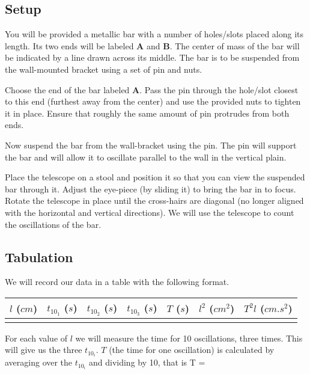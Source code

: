 \documentclass{article}
\begin{document}
      \subsection*{Setup}

         You will be provided a metallic bar with a number of holes/slots placed along its length. Its two ends will be labeled \textbf{A} and \textbf{B}. The center of mass of the bar will be indicated by a line drawn across its middle. The bar is to be suspended from the wall-mounted bracket using a set of pin and nuts.

         Choose the end of the bar labeled \textbf{A}. Pass the pin through the hole/slot closest to this end (furthest away from the center) and use the provided nuts to tighten it in place. Ensure that roughly the same amount of pin protrudes from both ends.

         Now suspend the bar from the wall-bracket using the pin. The pin will support the bar and will allow it to oscillate parallel to the wall in the vertical plain.

         Place the telescope on a stool and position it so that you can view the suspended bar through it. Adjust the eye-piece (by sliding it) to bring the bar in to focus. Rotate the telescope in place until the cross-hairs are diagonal (no longer aligned with the horizontal and vertical directions). We will use the telescope to count the oscillations of the bar.

      \subsection*{Tabulation}

         We will record our data in a table with the following format.

         \begin{table}[h]
            \centering

            \begin{tabular}{| c | c | c | c || c || c | c |}

               \hline
               $l$ ($cm$) & $t_{10_1}$ ($s$) & $t_{10_2}$ ($s$) & $t_{10_3}$ ($s$) & $T$ ($s$) & $l^2$ (${cm}^2$) & $T^2 l$ (${cm}.s^2$) \\

               \hline
                  & & & & & & \\
               \hline

            \end{tabular}
         \end{table}
         For each value of $l$ we will measure the time for 10 oscillations, three times. This will give us the three $t_{10_i}$. $T$ (the time for one oscillation) is calculated by averaging over the $t_{10_i}$ and dividing by 10, that is
         \beq
            T = 
         \eeq
\end{document}
